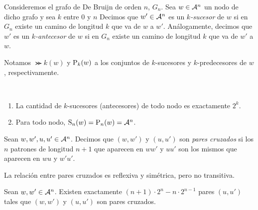 \documentclass[11pt]{article}
\begin{document}
\begin{definition}
	Consideremos el grafo de De Bruijn de orden $n$, $G_n$. Sea $w \in
		\mathcal{A}^n$ un nodo  de dicho grafo
	y sea $k$ entre $0$ y $n$
	Decimos que $w' \in \mathcal{A}^n$ es un \emph{$k$-sucesor} de $w$ si en $G_n$
	existe un camino de longitud $k$ que va de $w$ a $w'$.
	Análogamente, decimos que $w'$ es un \emph{$k$-antecesor} de $w$ si en $G_n$
	existe un camino de longitud $k$ que va de $w'$ a $w$.

	Notamos $\Succ{k}(w)$ y $\text{P}_{k}(w)$ a los conjuntos de $k$-sucesores y
	$k$-predecesores de $w$, respectivamente.
\end{definition}

\begin{remark}\ %
	\begin{enumerate}
		\item La cantidad de $k$-sucesores (antecesores) de todo nodo es
		      exactamente $2^k$.
		\item Para todo nodo, $\text{S}_{n}(w) = \text{P}_{n}(w) = \mathcal{A}^n$.
	\end{enumerate}
\end{remark}

\begin{definition}
	Sean $w,w',u,u' \in \mathcal{A}^n$. Decimos que $(w,w')$ y $(u,u')$ son
	\emph{pares cruzados} si los $n$ patrones de longitud $n + 1$ que aparecen en
	$ww'$ y $uu'$ son los mismos que aparecen en $wu$ y $w'u'$.
\end{definition}

\begin{remark}
	La relación entre pares cruzados es reflexiva y simétrica, pero no
	transitiva.
\end{remark}

\begin{proposition}
	Sean $w, w' \in \mathcal{A}^n$. Existen exactamente $(n + 1) \cdot 2^n - n
		\cdot 2^{n - 1}$ pares $(u, u')$ tales que $(w, w')$ y $(u, u')$ son pares
	cruzados.
\end{proposition}
\end{document}
